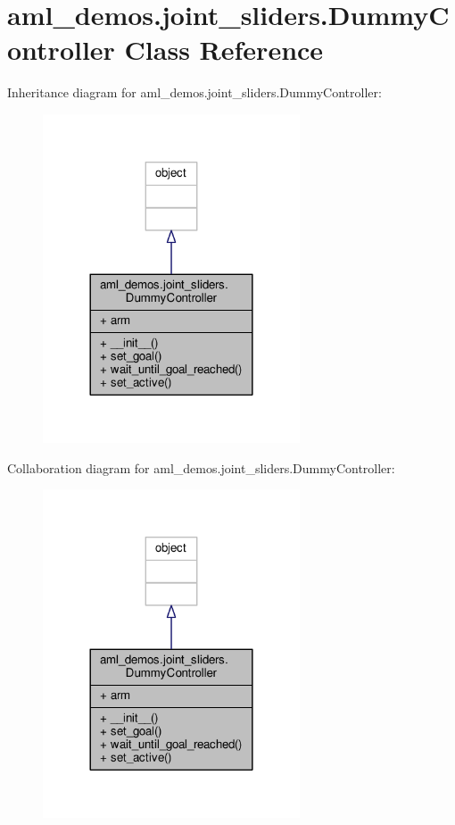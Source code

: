 \hypertarget{classaml__demos_1_1joint__sliders_1_1_dummy_controller}{\section{aml\-\_\-demos.\-joint\-\_\-sliders.\-Dummy\-Controller Class Reference}
\label{classaml__demos_1_1joint__sliders_1_1_dummy_controller}
}


Inheritance diagram for aml\-\_\-demos.\-joint\-\_\-sliders.\-Dummy\-Controller\-:
\nopagebreak
\begin{figure}[H]
\begin{center}
\leavevmode
\includegraphics[width=216pt]{classaml__demos_1_1joint__sliders_1_1_dummy_controller__inherit__graph}
\end{center}
\end{figure}


Collaboration diagram for aml\-\_\-demos.\-joint\-\_\-sliders.\-Dummy\-Controller\-:
\nopagebreak
\begin{figure}[H]
\begin{center}
\leavevmode
\includegraphics[width=216pt]{classaml__demos_1_1joint__sliders_1_1_dummy_controller__coll__graph}
\end{center}
\end{figure}
